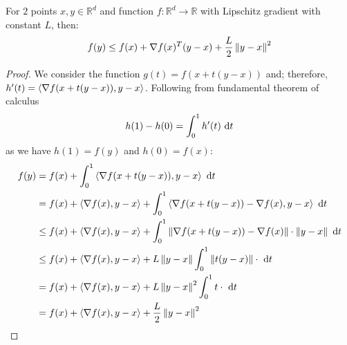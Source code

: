 \begin{lemma}
    \label{lem:smooth-ineq}
    For $2$ points $x, y \in \mathbb{R}^d$ and function $f:\mathbb{R}^d\rightarrow \mathbb{R}$ with Lipschitz gradient with constant $L$, then:
    \begin{equation*}
        f(y) \le f(x) + \nabla f(x)^T(y-x) + \frac{L}{2}\left\lVert y-x\right\rVert^2
    \end{equation*}
\end{lemma}
\begin{proof}
    We consider the function $g(t) = f(x + t(y-x))$ and; therefore, $h'(t)=\left\langle \nabla f(x+t(y-x)), y-x \right\rangle$. Following from fundamental theorem of calculus 
    \begin{equation*}
        h(1) - h(0) = \int^1_0 h'(t)\ \mathrm{d} t
    \end{equation*}
    as we have $h(1) = f(y)$ and $h(0) = f(x)$:
    \begin{equation*}
    \begin{aligned}
        f(y) &= f(x) + \int^1_0 \left\langle \nabla f(x+t(y-x)), y-x \right\rangle\ \mathrm{d} t \\
        &= f(x) + \left\langle \nabla f(x), y-x \right\rangle + \int^1_0 \left\langle \nabla f(x+t(y-x))- \nabla f(x), y-x \right\rangle\ \mathrm{d} t \\
        &\le f(x) + \left\langle \nabla f(x), y-x \right\rangle + \int^1_0 \left\lVert\nabla f(x+t(y-x))- \nabla f(x)\right\rVert\cdot\left\lVert y-x\right\rVert\ \mathrm{d} t \\
        &\le f(x) + \left\langle \nabla f(x), y-x \right\rangle + L\left\lVert y-x\right\rVert\int^1_0 \left\lVert t(y-x)\right\rVert\cdot \ \mathrm{d} t \\
        &= f(x) + \left\langle \nabla f(x), y-x \right\rangle + L\left\lVert y-x\right\rVert^2\int^1_0 t\cdot \ \mathrm{d} t \\
        &= f(x) + \left\langle \nabla f(x), y-x \right\rangle + \frac{L}{2}\left\lVert y-x\right\rVert^2 \\
    \end{aligned}
    \end{equation*}
\end{proof}

